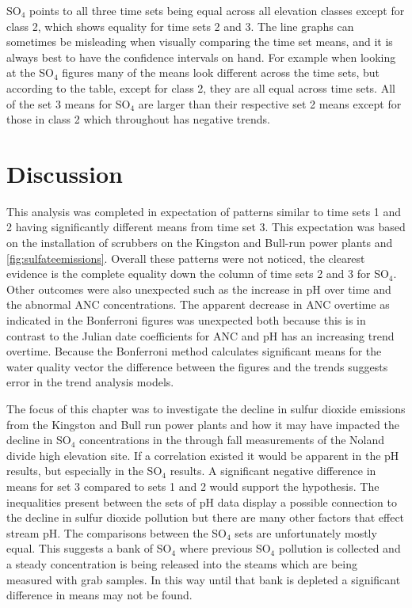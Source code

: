 SO$_4$ points to all three time sets being equal across all elevation classes except for class 2, which shows equality for time sets 2 and 3.  
The line graphs can sometimes be misleading when visually comparing the time set means, and it is always best to have the confidence intervals on hand.
For example when looking at the SO$_4$ figures many of the means look different across the time sets, but according to the table, except for class 2, they are all equal across time sets.
All of the set 3 means for SO$_4$ are larger than their respective set 2 means except for those in class 2 which throughout has negative trends.

\section{Discussion}
This analysis was completed in expectation of patterns similar to time sets 1 and 2 having significantly different means from time set 3.
This expectation was based on the installation of scrubbers on the Kingston and Bull-run power plants and \autoref{fig:sulfateemissions}.
Overall these patterns were not noticed, the clearest evidence is the complete equality down the column of time sets 2 and 3 for SO$_4$.
Other outcomes were also unexpected such as the increase in pH over time and the abnormal ANC concentrations.
The apparent decrease in ANC overtime as indicated in the Bonferroni figures was unexpected both because this is in contrast to the Julian date coefficients for ANC and pH has an increasing trend overtime.
Because the Bonferroni method calculates significant means for the water quality vector the difference between the figures and the trends suggests error in the trend analysis models.

The focus of this chapter was to investigate the decline in sulfur dioxide emissions from the Kingston and Bull run power plants and how it may have impacted the decline in SO$_4$  concentrations in the through fall measurements of the Noland divide high elevation site.
If a correlation existed it would be apparent in the pH results, but especially in the SO$_4$ results.
A significant negative difference in means for set 3 compared to sets 1 and 2 would support the hypothesis.
The inequalities present between the sets of pH data display a possible connection to the decline in sulfur dioxide pollution but there are many other factors that effect stream pH.
The comparisons between the SO$_4$ sets are unfortunately mostly equal.
This suggests a bank of SO$_4$ where previous SO$_4$ pollution is collected and a steady concentration is being released into the steams which are being measured with grab samples.
In this way until that bank is depleted a significant difference in means may not be found.
